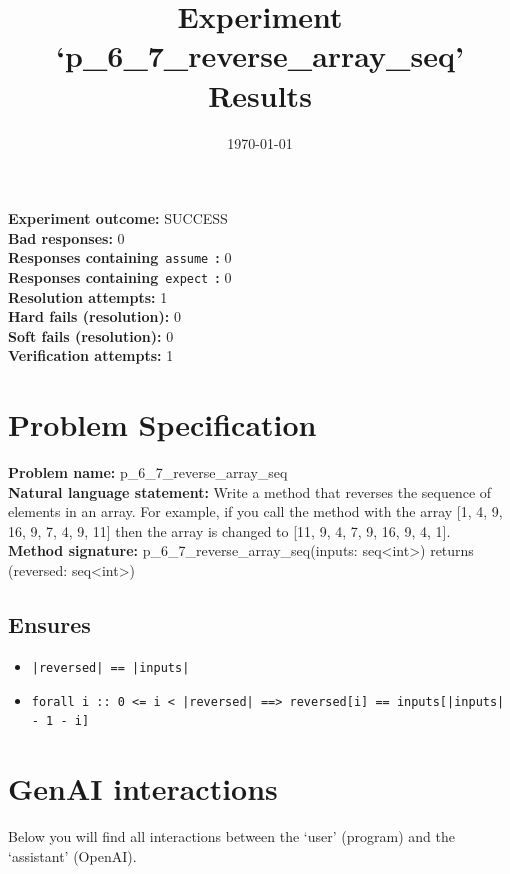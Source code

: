 \documentclass{article}
\begin{document}
\title{Experiment `p\_6\_7\_reverse\_array\_seq' Results}
\author{\today}
\date{}
\maketitle
\textbf{Experiment outcome: }SUCCESS
\\\textbf{Bad responses: }0
\\\textbf{Responses containing}~\texttt{assume}~\textbf{: }0
\\\textbf{Responses containing}~\texttt{expect}~\textbf{: }0
\\\textbf{Resolution attempts: }1
\\\textbf{Hard fails (resolution): }0
\\\textbf{Soft fails (resolution): }0
\\\textbf{Verification attempts: }1
\section*{Problem Specification}
\textbf{Problem name: }p\_6\_7\_reverse\_array\_seq
\\\textbf{Natural language statement: }Write a method that reverses the sequence of elements in an array. For example, if you call the method with the array [1, 4, 9, 16, 9, 7, 4, 9, 11] then the array is changed to [11, 9, 4, 7, 9, 16, 9, 4, 1].
\\\textbf{Method signature: }p\_6\_7\_reverse\_array\_seq(inputs: seq<int>) returns (reversed: seq<int>)
\subsection*{Ensures}
\begin{itemize}
\item \texttt{|reversed| == |inputs|}
\item \texttt{forall i :: 0 <= i < |reversed| ==> reversed[i] == inputs[|inputs| - 1 - i]}
\end{itemize}
\clearpage
\section*{GenAI interactions}
Below you will find all interactions between the `user' (program) and the `assistant' (OpenAI).
\end{document}
